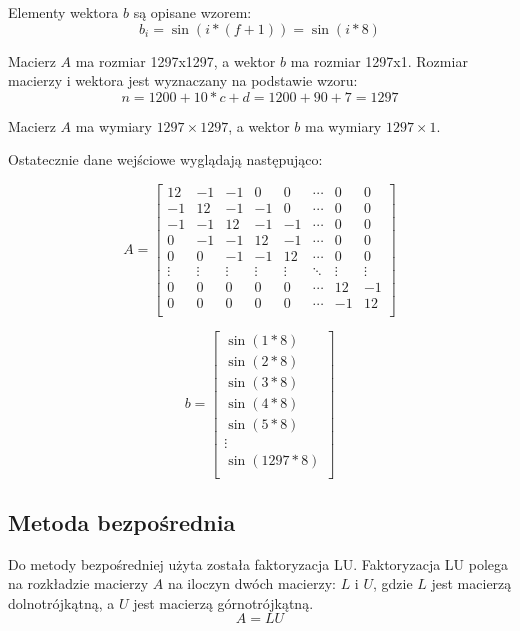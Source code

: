 \documentclass[a4paper,12pt]{article}  %
\begin{document}
Elementy wektora $b$ są opisane wzorem:
\begin{equation}
    b_i = \sin(i * (f+1)) = \sin(i * 8)
\end{equation}


Macierz $A$ ma rozmiar 1297x1297, a wektor $b$ ma rozmiar 1297x1.
Rozmiar macierzy i wektora jest wyznaczany na podstawie wzoru:
\begin{equation}
    n = 1200 + 10 * c + d = 1200 + 90 + 7 = 1297
\end{equation}

Macierz $A$ ma wymiary $1297 \times 1297$, a wektor $b$ ma wymiary $1297 \times 1$.
\smallbreak

Ostatecznie dane wejściowe wyglądają następująco:

\begin{equation}
  A = \begin{bmatrix}
    12 & -1 & -1 & 0 & 0 & \cdots & 0 & 0 \\
    -1 & 12 & -1 & -1 & 0 & \cdots & 0 & 0 \\
    -1 & -1 & 12 & -1 & -1 &  \cdots & 0 & 0 \\
    0 & -1 & -1 & 12 & -1 & \cdots & 0 & 0 \\
    0 & 0 & -1 & -1 & 12 & \cdots & 0 & 0 \\
    \vdots & \vdots & \vdots & \vdots & \vdots & \ddots & \vdots & \vdots \\
    0 & 0 & 0 & 0 & 0 & \cdots & 12 & -1 \\
    0 & 0 & 0 & 0 & 0 & \cdots & -1 & 12 \\
  \end{bmatrix}
\end{equation}

\begin{equation}
  b = \begin{bmatrix}
    \sin(1 * 8) \\
    \sin(2 * 8) \\
    \sin(3 * 8) \\
    \sin(4 * 8) \\
    \sin(5 * 8) \\
    \vdots \\
    \sin(1297 * 8) \\
  \end{bmatrix}
\end{equation}


\subsection{Metoda bezpośrednia}
Do metody bezpośredniej użyta została faktoryzacja LU.
Faktoryzacja LU polega na rozkładzie macierzy $A$ na iloczyn dwóch
macierzy: $L$ i $U$, gdzie $L$ jest macierzą dolnotrójkątną, a $U$ jest
macierzą górnotrójkątną.
\begin{equation}
    A = LU
\end{equation}
\end{document}
